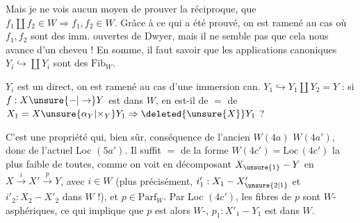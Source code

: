 

Mais je ne vois aucun moyen de prouver la réciproque, que $f_1\amalg f_2\in W\Rightarrow f_1,f_2\in W$. Grâce à  ce qui a été prouvé, on est ramené au cas où $f_1,f_2$ sont des imm. ouvertes de Dwyer, mais il ne semble pas que cela nous avance d'un cheveu !  En somme, il faut savoir que les applications canoniques $Y_i\hookrightarrow\coprod Y_i$ sont des $\mathrm{Fib}_W$.

  $Y_i$ est un  direct, on est ramené au cas d'une immersion can. $Y_1\hookrightarrow Y_1\amalg Y_2=Y$ : si $f:X\unsure{-|\to}Y$ est dans $W$, en est-il de $=$ de $X_1=X\unsure{\mathbin{\alpha}_Y|\times_Y}Y_1\Rightarrow\deleted{\unsure{X}}Y_1$ ?

C'est une propriété qui, bien sûr,  conséquence de l'ancien $W(4a)$ $W(4a')$, donc de l'actuel Loc $(5a')$. Il suffit $=$ de la forme $W(4c')=\mathrm{Loc}\,(4c')$ la plus faible de toutes, comme on voit en décomposant $X_{\unsure{1}}-Y$ en $X\xrightarrow{i}X'\xrightarrow{p}Y$, avec $i\in W$  (plus précisément, $i'_1:X_1-X'_{\unsure{2|1}}$ et $i'_2:X_2-X'_2$  dans $W$ !), et  $p\in\mathrm{Parf}_W$. Par Loc $(4c')$, les fibres de $p$ sont $W$-asphériques, ce qui implique que $p$ est alors $W$-,  $p_1:X'_1-Y_1$ est dans $W$.
